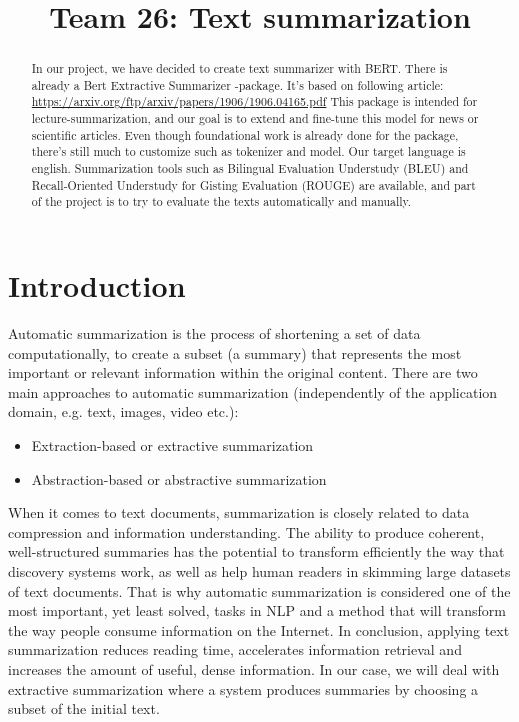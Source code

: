 \documentclass{article}
\title{Team 26: Text summarization}
\begin{document}
	
\maketitle

\begin{abstract}
\noindent
	In our project, we have decided to create text summarizer with BERT. 
	There is already a Bert Extractive Summarizer -package. It's based on following article: \href{https://arxiv.org/ftp/arxiv/papers/1906/1906.04165.pdf}{https://arxiv.org/ftp/arxiv/papers/1906/1906.04165.pdf}
	This package is intended for lecture-summarization, and our goal is to extend and fine-tune this model for news or scientific articles.
	Even though foundational work is already done for the package, there's still much to customize such as tokenizer and model. 
	Our target language is english. Summarization tools such as Bilingual Evaluation Understudy (BLEU) and Recall-Oriented Understudy for Gisting Evaluation (ROUGE) are available, and part of the project is to try to evaluate the texts automatically and manually.	
\end{abstract}

\clearpage
\section{Introduction}
Automatic summarization is the process of shortening a set of data computationally, to create a subset (a summary) that represents the most important or relevant information within the original content. There are two main approaches to automatic summarization (independently of the application domain, e.g. text, images, video etc.):
\begin{itemize}
	\item Extraction-based or extractive summarization 
	\item Abstraction-based or abstractive summarization
\end{itemize}

When it comes to text documents, summarization is closely related to data compression and information understanding. The ability to produce coherent, well-structured summaries has the potential to transform efficiently the way that discovery systems work, as well as help human readers in skimming large datasets of text documents. That is why automatic summarization is considered one of the most important, yet least solved, tasks in NLP and a method that will transform the way people consume information on the Internet. In conclusion, applying text summarization reduces reading time, accelerates information retrieval and increases the amount of useful, dense information. In our case, we will deal with extractive summarization where a system produces summaries by choosing a subset of the initial text.
\end{document}
